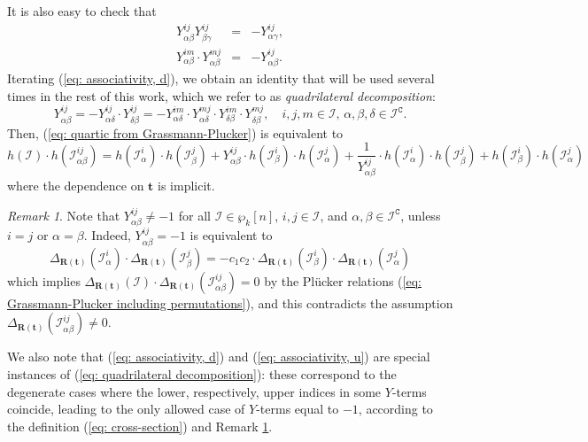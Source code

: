 \documentclass[10pt]{article}
\theoremstyle{remark}%
\newtheorem{rem}{Remark}%
\theoremstyle{definition}%
\begin{document}
It is also easy to check that 
\begin{eqnarray}
Y_{\alpha\beta}^{ij}Y_{\beta\gamma}^{ij} & = & -Y_{\alpha\gamma}^{ij},\label{eq: associativity, d}\\
Y_{\alpha\beta}^{im}\cdot Y_{\alpha\beta}^{mj} & = & -Y_{\alpha\beta}^{ij}.
\label{eq: associativity, u}
\end{eqnarray}
Iterating (\ref{eq: associativity, d}), we obtain an identity that will be used several times in the rest of this work, which we refer to as \emph{quadrilateral decomposition}:
\begin{equation}
    Y_{\alpha\beta}^{ij} = -Y_{\alpha\delta}^{ij}\cdot Y_{\delta\beta}^{ij} 
    = -Y_{\alpha\delta}^{im}\cdot Y_{\alpha\delta}^{mj}\cdot Y_{\delta\beta}^{im}\cdot Y_{\delta\beta}^{mj},\quad i,j,m\in\mathcal{I},\,\alpha,\beta,\delta\in\mathcal{I}^{\mathtt{C}}.
    \label{eq: quadrilateral decomposition}
\end{equation}
Then, (\ref{eq: quartic from Grassmann-Plucker}) is equivalent to 
 \begin{equation}
h(\mathcal{I})\cdot h(\mathcal{I}_{\alpha\beta}^{ij})=h(\mathcal{I}_{\alpha}^{i})\cdot h(\mathcal{I}_{\beta}^{j})+Y_{\alpha\beta}^{ij}\cdot h(\mathcal{I}_{\beta}^{i})\cdot h(\mathcal{I}_{\alpha}^{j})+\frac{1}{Y_{\alpha\beta}^{ij}}\cdot h(\mathcal{I}_{\alpha}^{i})\cdot h(\mathcal{I}_{\beta}^{j})+h(\mathcal{I}_{\beta}^{i})\cdot h(\mathcal{I}_{\alpha}^{j})\label{eq: quartic from Grassmann-Plucker, 2}
 \end{equation}
where the dependence on $\mathbf{t}$ is implicit. 
\begin{rem}
\label{rem: no Y=-1} Note that $Y_{\alpha\beta}^{ij}\neq-1$
for all $\mathcal{\mathcal{I}\in\wp}_{k}[n]$, $i,j\in\mathcal{I}$, and $\alpha,\beta\in\mathcal{I}^{\mathtt{C}}$, unless $i=j$ or $\alpha=\beta$. Indeed, $Y_{\alpha\beta}^{ij}=-1$ is equivalent to 
\begin{equation*} 
\Delta_{\mathbf{R}(\mathbf{t})}(\mathcal{I}_{\alpha}^{i})\cdot\Delta_{\mathbf{R}(\mathbf{t})}(\mathcal{I}_{\beta}^{j})=-c_{1}c_{2}\cdot\Delta_{\mathbf{R}(\mathbf{t})}(\mathcal{I}_{\beta}^{i})\cdot\Delta_{\mathbf{R}(\mathbf{t})}(\mathcal{I}_{\alpha}^{j})
\end{equation*}
which implies $\Delta_{\mathbf{R}(\mathbf{t})}(\mathcal{I})\cdot\Delta_{\mathbf{R}(\mathbf{t})}(\mathcal{I}_{\alpha\beta}^{ij})=0$ by the Pl\"{u}cker relations (\ref{eq: Grassmann-Plucker including permutations}), and this contradicts the assumption $\Delta_{\mathbf{R}(\mathbf{t})}(\mathcal{I}_{\alpha\beta}^{ij})\neq0$. 
\end{rem}
We also note that (\ref{eq: associativity, d}) and (\ref{eq: associativity, u}) are special instances of (\ref{eq: quadrilateral decomposition}): these correspond to the degenerate cases where the lower, respectively, upper indices in some $Y$-terms coincide, leading to the only allowed case of $Y$-terms equal to $-1$, according to the definition (\ref{eq: cross-section}) and Remark \ref{rem: no Y=-1}.
\end{document}
